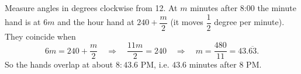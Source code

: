 Measure angles in degrees clockwise from 12. At $m$ minutes after 8:00 the minute hand is at $6m$ and the hour hand at $240+\dfrac {m}{2}$ (it moves $\dfrac{1}{2}$ degree per minute). They coincide when
\[
6m=240+\dfrac {m}{2}\quad\Longrightarrow\quad \dfrac{11m}{2}=240\quad\Longrightarrow\quad m=\dfrac{480}{11}=43.\overline{63}.
\]
So the hands overlap at about $\boxed{8{:}43.6}$ PM, i.e. $43.6$ minutes after 8 PM.
